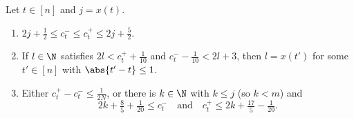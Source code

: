 \begin{lemma}\label{lem:link}
Let $t\in[n]$ and $j=x(t)$.
\begin{enumerate}[label=(\alph*)]
\item\label{lk:inside} $2j+\frac12\le c_t^-\le c_t^+\le2j+\frac52$.
\item\label{lk:tight} If $l\in\N$ satisfies $2l<c_t^++\frac1{10}$ and $c_t^--\frac1{10}<2l+3$, then
$l=x(t')$ for some $t'\in[n]$ with $\abs{t'-t}\le1$.
\item\label{lk:small} Either $c_t^+-c_t^-\le\frac1{2N}$, or there is $k\in\N$ with $k\le j$ (so
$k<m$) and
\[
2k+\tfrac85+\tfrac1{20}\le c_t^-\quad\text{and}\quad c_t^+\le2k+\tfrac{17}5-\tfrac1{20}.
\]
\end{enumerate}
\end{lemma}

